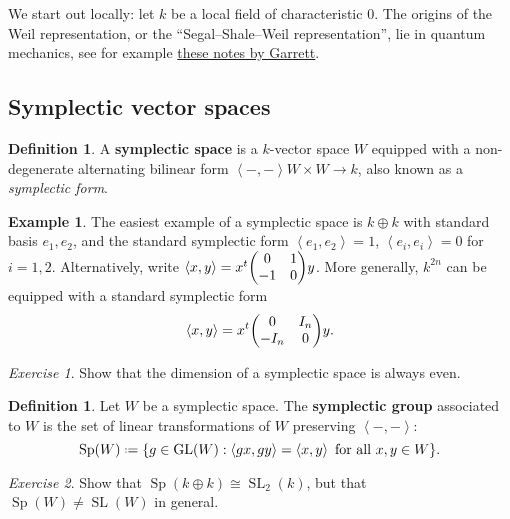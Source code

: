 \documentclass[11pt,a4paper,leqno]{article}
\newcommand{\1}{\mathbbm{1}}
\newcommand*{\defeq}{\mathrel{\vcenter{\baselineskip0.5ex \lineskiplimit0pt
      \hbox{\scriptsize.}\hbox{\scriptsize.}}}%
  =}
\DeclareMathOperator{\SL}{SL}
\DeclareMathOperator{\Sp}{Sp}
\DeclareMathOperator{\GL}{GL}
\theoremstyle{plain}
\theoremstyle{definition}
\newtheorem{definition}[theorem]{Definition}
\newtheorem{example}[theorem]{Example}
\theoremstyle{remark}
\newtheorem*{exercise}{Exercise}
\numberwithin{equation}{section}
\begin{document}
We start out locally: let $k$ be a local field of characteristic $0$.
The origins of the Weil representation, or the ``Segal--Shale--Weil
representation'', lie in quantum mechanics, see for example
\href{https://www-users.cse.umn.edu/~garrett/m/v/oscillator_repn.pdf}{these
  notes by Garrett}.
\subsection{Symplectic vector spaces}
\label{sec:sympl-vect-spac}

\begin{definition}
  A \textbf{symplectic space} is a $k$-vector space $W$ equipped with a
  non-degenerate alternating bilinear form
  $\left\langle {-},{-} \right\rangle W \times W \to k$, also known as a \emph{symplectic
    form}.
\end{definition}

\begin{example}\label{eg:standard-sympl}
  The easiest example of a symplectic space is $k\oplus k$ with standard
  basis $e_{1},e_{2}$, and the standard symplectic form
  $\left\langle e_{1},e_{2} \right\rangle= 1$, $\left\langle e_{i},e_{i} \right\rangle= 0$ for
  $i=1,2$. Alternatively, write $\left\langle x,y \right\rangle = x^{t}\mqty( 0 & 1 \\
  -1 & 0)y$. More generally, $k^{2n}$ can be equipped with a standard
  symplectic form
  \begin{equation}
    \label{eq:14}
  \left\langle x,y \right\rangle =  x^t\mqty(0  & I_n \\ -I_n & 0)y.
  \end{equation}
\end{example}
\begin{exercise}
Show that the dimension of a symplectic space is always even. 
\end{exercise}
\begin{definition}
  Let $W$ be a symplectic space. The \textbf{symplectic group}
  associated to $W$ is the set of linear transformations of $W$
  preserving $\left\langle {-},{-} \right\rangle$:
  \begin{equation}
    \label{eq:6}
  \Sp(W) \defeq \{g \in \GL(W) : \left\langle gx,gy \right\rangle = \left\langle x,y
  \right\rangle \text{ for all } x,y \in W\}.
  \end{equation}
\end{definition}

\begin{exercise}
  Show that $\Sp(k\oplus k) \cong \SL_{2}(k)$, but that $\Sp(W) \neq
  \SL(W)$ in general.
\end{exercise}
\end{document}
